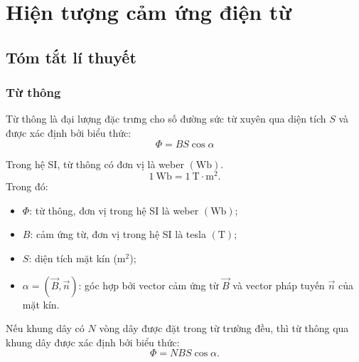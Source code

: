 \section{Hiện tượng cảm ứng điện từ}
\subsection{Tóm tắt lí thuyết}
\begin{tomtat}
	\subsubsection{Từ thông}
	\begin{center}
	\end{center}
	\begin{dn}
		Từ thông là đại lượng đặc trưng cho số đường sức từ xuyên qua diện tích $S$ và được xác định bởi biểu thức:
		\begin{equation}
			\Phi=BS\cos\alpha
		\end{equation}
	\end{dn}
	Trong hệ SI, từ thông có đơn vị là weber $\left(\si{\weber}\right)$.
	$$\SI{1}{\weber}=\SI{1}{\tesla\cdot\meter^2}.$$
	Trong đó:
	\begin{itemize}
		\item $\Phi$: từ thông, đơn vị trong hệ SI là weber $\left(\si{\weber}\right)$;
		\item $B$: cảm ứng từ, đơn vị trong hệ SI là tesla $\left(\si{\tesla}\right)$;
		\item $S$: diện tích mặt kín ($\si{\meter^2}$);
		\item $\alpha=\left(\vec{B},\vec{n}\right)$: góc hợp bởi vector cảm ứng từ $\vec{B}$ và vector pháp tuyến $\vec{n}$ của mặt kín.
	\end{itemize}
	\begin{luuy}
		Nếu khung dây có $N$ vòng dây được đặt trong từ trường đều, thì từ thông qua khung dây được xác định bởi biểu thức:
		$$\Phi=NBS\cos\alpha.$$
	\end{luuy}

\end{tomtat}
